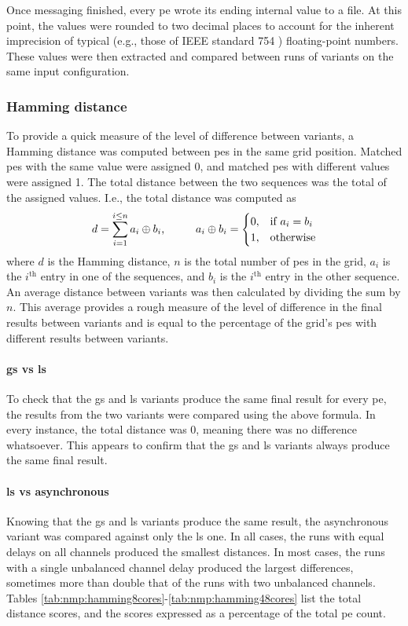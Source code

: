 Once messaging finished, every \gls{pe} wrote its ending internal value to a file.  At this point, the values were rounded to two decimal places to account for the inherent imprecision of typical (e.g., those of IEEE standard 754 \cite{ieee754,Goldberg1991}) floating-point numbers.  These values were then extracted and compared between runs of variants on the same input configuration.

\subsubsection{Hamming distance}
To provide a quick measure of the level of difference between variants, a Hamming distance was computed between \glspl{pe} in the same grid position.  Matched \glspl{pe} with the same value were assigned 0, and matched \glspl{pe} with different values were assigned 1.  The total distance between the two sequences was the total of the assigned values.  I.e., the total distance was computed as \[d = \sum_{i = 1}^{i \leq n} a_i \oplus b_i\text{,}
\hspace{1.0cm}%
a_i \oplus b_i = \begin{cases}
    0, & \text{if } a_i = b_i \\
    1, & \text{otherwise}
\end{cases}
\] where \(d\) is the Hamming distance, \(n\) is the total number of \glspl{pe} in the grid, \(a_i\) is the \(i^{\text{th}}\) entry in one of the sequences, and \(b_i\) is the \(i^{\text{th}}\) entry in the other sequence.  An average distance between variants was then calculated by dividing the sum by \(n\).  This average provides a rough measure of the level of difference in the final results between variants and is equal to the percentage of the grid's \glspl{pe} with different results between variants.

\paragraph{\Gls{gs} vs \gls{ls}}
To check that the \gls{gs} and \gls{ls} variants produce the same final result for every \gls{pe}, the results from the two variants were compared using the above formula.  In every instance, the total distance was 0, meaning there was no difference whatsoever.  This appears to confirm that the \gls{gs} and \gls{ls} variants always produce the same final result.

\paragraph{\Gls{ls} vs asynchronous}
Knowing that the \gls{gs} and \gls{ls} variants produce the same result, the asynchronous variant was compared against only the \gls{ls} one.  In all cases, the runs with equal delays on all channels produced the smallest distances.  In most cases, the runs with a single unbalanced channel delay produced the largest differences, sometimes more than double that of the runs with two unbalanced channels.  Tables \ref{tab:nmp:hamming8cores}-\ref{tab:nmp:hamming48cores} list the total distance scores, and the scores expressed as a percentage of the total \gls{pe} count.

